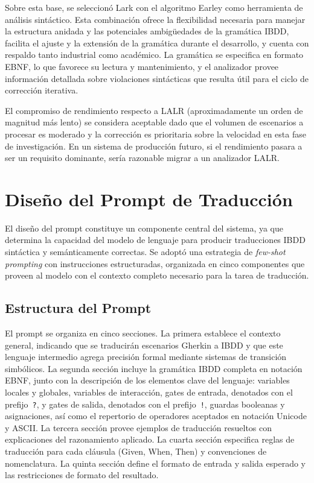 Sobre esta base, se seleccionó Lark con el algoritmo Earley como herramienta de análisis sintáctico. Esta combinación ofrece la flexibilidad necesaria para manejar la estructura anidada y las potenciales ambigüedades de la gramática IBDD, facilita el ajuste y la extensión de la gramática durante el desarrollo, y cuenta con respaldo tanto industrial como académico. La gramática se especifica en formato EBNF, lo que favorece su lectura y mantenimiento, y el analizador provee información detallada sobre violaciones sintácticas que resulta útil para el ciclo de corrección iterativa.

El compromiso de rendimiento respecto a LALR (aproximadamente un orden de magnitud más lento) se considera aceptable dado que el volumen de escenarios a procesar es moderado y la corrección es prioritaria sobre la velocidad en esta fase de investigación. En un sistema de producción futuro, si el rendimiento pasara a ser un requisito dominante, sería razonable migrar a un analizador LALR.

\section{Diseño del Prompt de Traducción}
\label{sec:prompt-design}

El diseño del prompt constituye un componente central del sistema, ya que determina la capacidad del modelo de lenguaje para producir traducciones IBDD sintáctica y semánticamente correctas. Se adoptó una estrategia de \textit{few-shot prompting} con instrucciones estructuradas, organizada en cinco componentes que proveen al modelo con el contexto completo necesario para la tarea de traducción.

\subsection{Estructura del Prompt}

El prompt se organiza en cinco secciones. La primera establece el contexto general, indicando que se traducirán escenarios Gherkin a IBDD y que este lenguaje intermedio agrega precisión formal mediante sistemas de transición simbólicos. La segunda sección incluye la gramática IBDD completa en notación EBNF, junto con la descripción de los elementos clave del lenguaje: variables locales y globales, variables de interacción, gates de entrada, denotados con el prefijo~\texttt{?}, y gates de salida, denotados con el prefijo~\texttt{!}, guardas booleanas y asignaciones, así como el repertorio de operadores aceptados en notación Unicode y ASCII. La tercera sección provee ejemplos de traducción resueltos con explicaciones del razonamiento aplicado. La cuarta sección especifica reglas de traducción para cada cláusula (Given, When, Then) y convenciones de nomenclatura. La quinta sección define el formato de entrada y salida esperado y las restricciones de formato del resultado.

